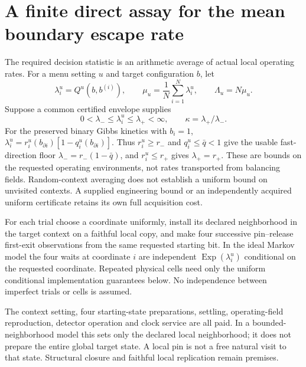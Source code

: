 \providecommand{\RAE}{\mathbb E}
\providecommand{\RAP}{\mathbb P}
\providecommand{\RAone}{\mathbf1}
\providecommand{\RAKL}{\operatorname{KL}}

\section{A finite direct assay for the mean boundary escape rate}
\label{sec:rate_assay}
The required decision statistic is an arithmetic average of actual local
operating rates. For a menu setting $u$ and target configuration $b$, let
\[
 \lambda_i^u=Q^u(b,b^{(i)}),\qquad
 \mu_u=\frac1N\sum_{i=1}^N\lambda_i^u,
 \qquad \Lambda_u=N\mu_u.
\]
Suppose a common certified envelope supplies
\begin{equation}
 0<\lambda_-\le\lambda_i^u\le\lambda_+<\infty,
 \qquad \kappa=\lambda_+/\lambda_-.
 \label{ra:bounds}
\end{equation}
For the preserved binary Gibbs kinetics with $b_i=1$,
$\lambda_i^u=r_i^u(b_{\partial i})[1-q_i^u(b_{\partial i})]$.
Thus $r_i^u\ge r_-$ and $q_i^u\le\bar q<1$ give the usable fast-direction
floor $\lambda_-=r_-(1-\bar q)$, and $r_i^u\le r_+$ gives
$\lambda_+=r_+$. These are bounds on the requested operating environments,
not rates transported from balancing fields.
Random-context averaging does not establish a uniform bound on unvisited
contexts. A supplied engineering bound or an independently acquired
uniform certificate retains its own full acquisition cost.

For each trial choose a coordinate uniformly, install its declared
neighborhood in the target context on a faithful local copy, and make
four successive pin--release first-exit observations from the same
requested starting bit. In the ideal Markov model the four waits at
coordinate $i$ are independent $\operatorname{Exp}(\lambda_i^u)$
conditional on the requested coordinate. Repeated physical cells need
only the uniform conditional implementation guarantees below. No
independence between imperfect trials or cells is assumed.

The context setting, four starting-state preparations, settling,
operating-field reproduction, detector operation and clock service are
all paid. In a bounded-neighborhood model this sets only the declared
local neighborhood; it does not prepare the entire global target state.
A local pin is not a free natural visit to that state. Structural closure
and faithful local replication remain premises.

